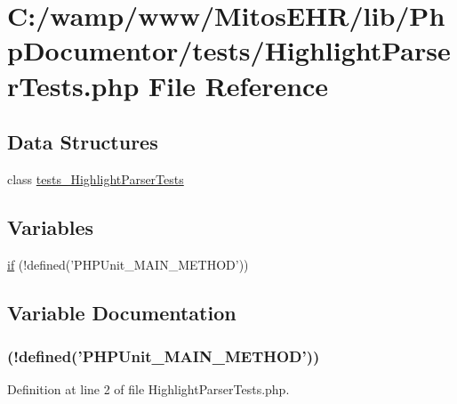 \hypertarget{_highlight_parser_tests_8php}{\section{\-C\-:/wamp/www/\-Mitos\-E\-H\-R/lib/\-Php\-Documentor/tests/\-Highlight\-Parser\-Tests.php \-File \-Reference}
\label{_highlight_parser_tests_8php}
}
\subsection*{\-Data \-Structures}
\begin{DoxyCompactItemize}
\item 
class \hyperlink{classtests___highlight_parser_tests}{tests\-\_\-\-Highlight\-Parser\-Tests}
\end{DoxyCompactItemize}
\subsection*{\-Variables}
\begin{DoxyCompactItemize}
\item 
\hyperlink{_highlight_parser_tests_8php_a3120764b3588ecfc55f4be599e83d6f9}{if} (!defined('\-P\-H\-P\-Unit\-\_\-\-M\-A\-I\-N\-\_\-\-M\-E\-T\-H\-O\-D'))
\end{DoxyCompactItemize}


\subsection{\-Variable \-Documentation}
\hypertarget{_highlight_parser_tests_8php_a3120764b3588ecfc55f4be599e83d6f9}{
\subsubsection[{if}]{(!defined('\-P\-H\-P\-Unit\-\_\-\-M\-A\-I\-N\-\_\-\-M\-E\-T\-H\-O\-D'))}}\label{_highlight_parser_tests_8php_a3120764b3588ecfc55f4be599e83d6f9}


\-Definition at line 2 of file \-Highlight\-Parser\-Tests.\-php.

